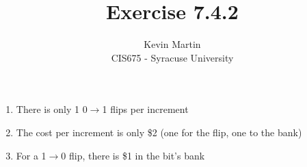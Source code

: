 \documentclass{article}
\author{Kevin Martin\\ CIS675 - Syracuse University}
\title{Exercise 7.4.2}
\begin{document}
\maketitle
\begin{enumerate}
  \item There is only 1 0$\to$1 flips per increment
  \item The cost per increment is only \$2 (one for the flip, one to the bank)
  \item For a 1$\to$0 flip, there is \$1 in the bit's bank
\end{enumerate}
\end{document}
